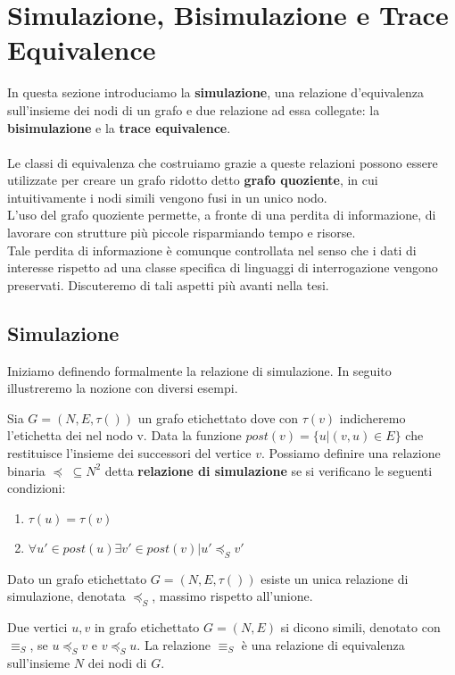 \newpage
\section{Simulazione, Bisimulazione e Trace Equivalence}
In questa sezione introduciamo la \textbf{simulazione}, una relazione d'equivalenza sull'insieme dei nodi di un grafo e due relazione ad essa collegate: la \textbf{bisimulazione} e la \textbf{trace equivalence}.
\\\\
Le classi di equivalenza che costruiamo grazie a queste relazioni possono essere utilizzate per creare un grafo ridotto detto \textbf{grafo quoziente}, in cui intuitivamente i nodi simili vengono fusi in un unico nodo.\\
L'uso del grafo quoziente permette, a fronte di una perdita di informazione, di lavorare con strutture più piccole risparmiando tempo e risorse.\\
Tale perdita di  informazione è comunque controllata nel senso che i dati di interesse rispetto ad una classe specifica di linguaggi di interrogazione vengono preservati. Discuteremo di tali aspetti più avanti nella tesi.

\subsection{Simulazione}
Iniziamo definendo formalmente la relazione di simulazione. In seguito illustreremo la nozione con diversi esempi.

\begin{definition}
Sia $G = (N, E, \tau())$ un grafo etichettato dove con $\tau(v)$ indicheremo l'etichetta dei nel nodo v. Data la funzione $post(v) = \{u|(v,u) \in E\}$ che restituisce l'insieme dei successori del vertice $v$.
Possiamo definire una relazione binaria $\preceq\;\subseteq N^2$ detta \textbf{relazione di simulazione} se si verificano le seguenti condizioni:
\begin{enumerate}
\item $\tau(u) = \tau(v)$
\item $\forall u' \in post(u) \exists v' \in post(v) | u' \preceq_S v'$
\end{enumerate}
\begin{lemma}
Dato un grafo etichettato $G = (N,E,\tau())$ esiste un unica relazione di simulazione, denotata $\preceq_S$, massimo rispetto all'unione.
\end{lemma}
\end{definition}
\begin{definition}
Due vertici $u,v$ in grafo etichettato $G = (N,E)$ si dicono simili, denotato con $\equiv_S$, se $u\preceq_Sv$ e $v\preceq_Su$. La relazione $\equiv_S$ è una relazione di equivalenza sull'insieme $N$ dei nodi di $G$.
\end{definition}

